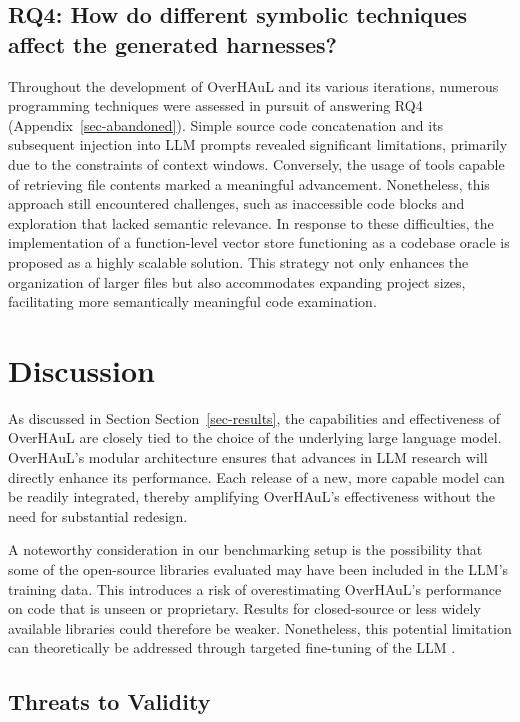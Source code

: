 \documentclass[
  a4paper,
]{scrreprt}
\theoremstyle{definition}
\theoremstyle{remark}
\begin{document}
\subsection{RQ4: How do different symbolic techniques affect the
generated
harnesses?}\label{rq4-how-do-different-symbolic-techniques-affect-the-generated-harnesses}

Throughout the development of OverHAuL and its various iterations,
numerous programming techniques were assessed in pursuit of answering
RQ4 (Appendix~\ref{sec-abandoned}). Simple source code concatenation and
its subsequent injection into LLM prompts revealed significant
limitations, primarily due to the constraints of context windows.
Conversely, the usage of tools capable of retrieving file contents
marked a meaningful advancement. Nonetheless, this approach still
encountered challenges, such as inaccessible code blocks and exploration
that lacked semantic relevance. In response to these difficulties, the
implementation of a function-level vector store functioning as a
codebase oracle is proposed as a highly scalable solution. This strategy
not only enhances the organization of larger files but also accommodates
expanding project sizes, facilitating more semantically meaningful code
examination.

\section{Discussion}\label{discussion}

As discussed in Section Section~\ref{sec-results}, the capabilities and
effectiveness of OverHAuL are closely tied to the choice of the
underlying large language model. OverHAuL's modular architecture ensures
that advances in LLM research will directly enhance its performance.
Each release of a new, more capable model can be readily integrated,
thereby amplifying OverHAuL's effectiveness without the need for
substantial redesign.

A noteworthy consideration in our benchmarking setup is the possibility
that some of the open-source libraries evaluated may have been included
in the LLM's training data. This introduces a risk of overestimating
OverHAuL's performance on code that is unseen or proprietary. Results
for closed-source or less widely available libraries could therefore be
weaker. Nonetheless, this potential limitation can theoretically be
addressed through targeted fine-tuning of the LLM
\autocite{openaidocs2025b,kim2025}.

\subsection{Threats to Validity}\label{threats-to-validity}
\end{document}
